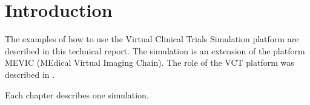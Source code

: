 \chapter{Introduction}

The examples of how to use the Virtual Clinical Trials Simulation platform are described in this technical report. The simulation is an extension of the platform MEVIC (MEdical Virtual Imaging Chain)\cite{Mar08}. The role of the VCT platform was described in \cite{Mai13}.

Each chapter describes one simulation.